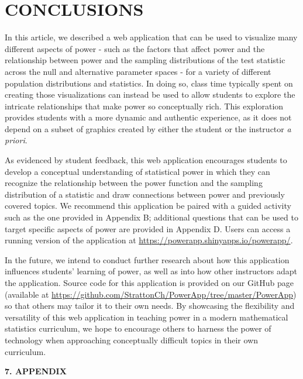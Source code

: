 \documentclass{TISE}
\begin{document}
\section{CONCLUSIONS}

In this article, we described a web application that can be used to visualize many different aspects of power - such as the factors that affect power and the relationship between power and the sampling distributions of the test statistic across the null and alternative parameter spaces - for a variety of different population distributions and statistics. In doing so, class time typically spent on creating those visualizations can instead be used to allow students to explore the intricate relationships that make power so conceptually rich. This exploration provides students with a more dynamic and authentic experience, as it does not depend on a subset of graphics created by either the student or the instructor \textit{a priori}. 

As evidenced by student feedback, this web application encourages students to develop a conceptual understanding of statistical power in which they can recognize the relationship between the power function and the sampling distribution of a statistic and draw connections between power and previously covered topics. We recommend this application be paired with a guided activity such as the one provided in Appendix B; additional questions that can be used to target specific aspects of power are provided in Appendix D. Users can access a running version of the application at \url{https://powerapp.shinyapps.io/powerapp/}.

In the future, we intend to conduct further research about how this application influences students' learning of power, as well as into how other instructors adapt the application.  Source code for this application is provided on our GitHub page (available at \url{https://github.com/StrattonCh/PowerApp/tree/master/PowerApp}) so that others may tailor it to their own needs. By showcasing the flexibility and versatility of this web application in teaching power in a modern mathematical statistics curriculum, we hope to encourage others to harness the power of technology when approaching conceptually difficult topics in their own curriculum. 

\newpage

\renewcommand\refname{\large 6. REFERENCES}


\newpage

\begin{center}
	\textbf{\large 7. APPENDIX}
\end{center}
\end{document}
